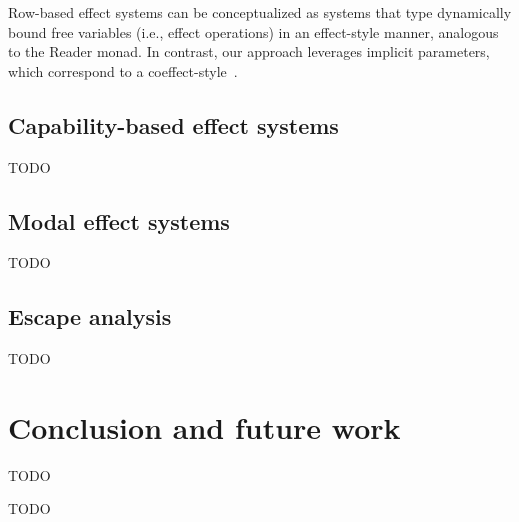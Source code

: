 \documentclass[acmsmall,review,screen]{acmart}
\begin{document}
Row-based effect systems can be conceptualized as systems that type dynamically bound free variables (i.e., effect operations) in an effect-style manner, analogous to the Reader monad.
In contrast, our approach leverages implicit parameters, which correspond to a coeffect-style~\cite{petricek2014coeffects}. %

\subsection{Capability-based effect systems} \label{subsec:overview-caps}



TODO %

\subsection{Modal effect systems} \label{subsec:overview-modal}

TODO %

\subsection{Escape analysis} \label{subsec:overview-escape-analysis}

TODO %





\section{Conclusion and future work} \label{sec:conclusion}



TODO %


\begin{acks}
    TODO %
\end{acks}




\end{document}
